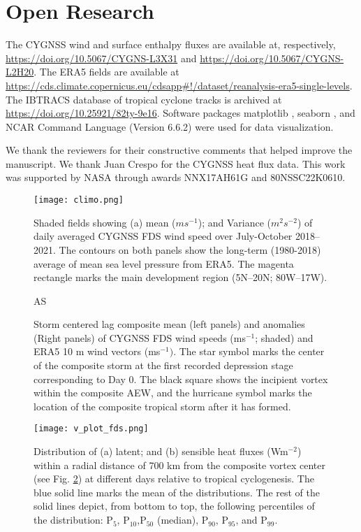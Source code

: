 \documentclass[draft]{agujournal2019}
\begin{document}
\section{Open Research}
The CYGNSS wind and surface enthalpy fluxes are available at, respectively, \url{https://doi.org/10.5067/CYGNS-L3X31} and  \url{https://doi.org/10.5067/CYGNS-L2H20}. The ERA5 fields are available at  \url{https://cds.climate.copernicus.eu/cdsapp#!/dataset/reanalysis-era5-single-levels}. The IBTRACS database of tropical cyclone tracks is archived at \url{https://doi.org/10.25921/82ty-9e16}. Software packages matplotlib \cite{Hunter:2007}, seaborn \cite{Waskom2021}, and NCAR Command Language (Version 6.6.2) were used for data visualization.


\acknowledgments
We thank the reviewers for their constructive comments that helped improve the manuscript. We thank Juan Crespo for the CYGNSS heat flux data. This work was supported by NASA through awards NNX17AH61G and 80NSSC22K0610.


\newpage


\begin{figure}
 \texttt{[image: climo.png]}
 \caption{Shaded fields showing (a) mean ($ms^{-1}$); and   Variance ($m^{2}s^{-2}$)  of daily averaged CYGNSS FDS wind speed over July-October 2018--2021. The contours on both panels show the long-term (1980-2018) average of mean sea level pressure from ERA5. The magenta rectangle marks the main development region (5N--20N; 80W--17W).}
 \label{fig:climo}
\end{figure}

%
\begin{figure}
 \caption{Storm centered lag composite mean (left panels) and anomalies (Right panels) of CYGNSS FDS wind speeds (ms$^{-1}$;  shaded) and ERA5 10 m wind vectors (ms$^{-1})$. The star symbol marks the center of the composite storm at the first recorded depression stage corresponding to Day 0. The black square shows the incipient vortex within the composite AEW, and the hurricane symbol marks the location of the composite tropical storm after it has formed.}
 \label{fig:comp}

AS\end{figure}


\begin{figure}
 \texttt{[image: v\_plot\_fds.png]}
 \caption{Distribution of (a) latent; and (b) sensible heat fluxes (Wm$^{-2}$) within a radial distance of 700 km from the composite vortex center (see Fig. \ref{fig:comp}) at different days relative to tropical cyclogenesis. The blue solid line marks the mean of the distributions. The rest of the solid lines depict, from bottom to top, the following percentiles of the distribution: P$_5$, P$_{10}$,P$_{50}$ (median), P$_{90}$, P$_{95}$, and P$_{99}$.}
 \label{fig:vplot_fds}
\end{figure}
\end{document}
